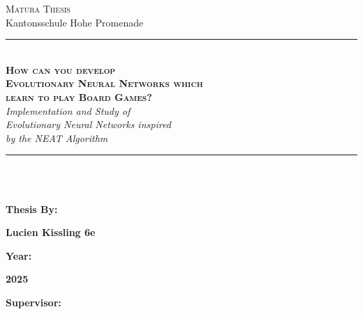 \documentclass[11pt]{report}
\begin{document}
    \begin{titlepage}
        \BgThispage
            \color{white} {
                \begin{center}
                    \Large \textsc{Matura Thesis}\\Kantonsschule Hohe Promenade\\
                    \rule[0.1cm]{15.8cm}{0.1mm}\\
                    \vspace{3cm}
                    \Huge \textbf{ \textsc{How can you develop \\Evolutionary Neural Networks which \\learn to play Board Games?}}\\
                    \vspace{0.8cm}
                    \Large \textit {Implementation and Study of\\ Evolutionary Neural Networks inspired\\ by the NEAT Algorithm}\\
                \end{center}
                \vspace{3cm}
                \rule[0.1cm]{15.8cm}{0.1mm}\\
                \vspace{9cm}\\
                \begin{minipage}[t]{0.47\textwidth}
                \large\textbf {Thesis By:}\\
                \end{minipage}
                \hfill
                \begin{minipage}[t]{0.47\textwidth}\raggedleft
                \large\textbf {Lucien Kissling 6e}\\
                \end{minipage}
                \begin{minipage}[t]{0.47\textwidth}
                \large \textbf {Year:}\\
                \end{minipage}
                \hfill
                \begin{minipage}[t]{0.47\textwidth}\raggedleft
                \large \textbf {2025}\\
                \end{minipage}
                \begin{minipage}[t]{0.47\textwidth}
                \large \textbf {Supervisor:}\\

\end{minipage}}
\end{titlepage}
\end{document}
